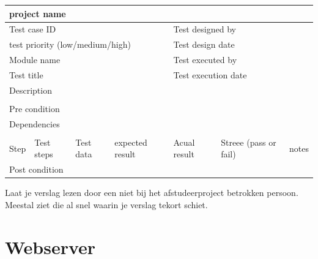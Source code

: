 		\begin{tabular}{|l|l|l|l|l|l|l|} \hline
			\multicolumn{7}{|l|}{project name}                                                               \\ \hline
			\multicolumn{4}{|l|}{Test case ID}   &\multicolumn{3}{|l|}{Test designed by}                           \\ \hline
			\multicolumn{4}{|l|}{test priority (low/medium/high)}   &\multicolumn{3}{|l|}{Test design date}                           \\ \hline
			\multicolumn{4}{|l|}{Module name}   &\multicolumn{3}{|l|}{Test executed by}                           \\ \hline
			\multicolumn{4}{|l|}{Test title}   &\multicolumn{3}{|l|}{Test execution date}                           \\ \hline
			\multicolumn{4}{|l|}{Description}   &\multicolumn{3}{|l|}{ }                           \\ \hline 		
			\multicolumn{7}{|l|}{ }   																\\ \hline
			\multicolumn{7}{|l|}{Pre condition}                                                               \\ \hline
			\multicolumn{7}{|l|}{Dependencies}                                                               \\ \hline
			\multicolumn{7}{|l|}{ }   															\\ \hline
			Step  &  Test steps & Test data & expected result &Acual result &Streee (pass or fail)&notes  \\ \hline
			\multicolumn{7}{|l|}{Post condition}                                                               \\ \hline
		\end{tabular}
		
		Laat je verslag lezen door een niet bij het afstudeerproject betrokken
		persoon. Meestal ziet die al snel waarin je verslag tekort schiet.
		 
		
		
		\section{Webserver}
		
		\begin{usecase}
		\end{usecase}
	 

